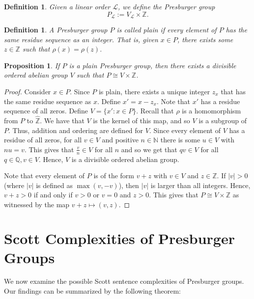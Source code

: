 \documentclass{amsart}%
\numberwithin{theorem}{section}
\newtheorem{definition}[theorem]{Definition}
\newtheorem{proposition}[theorem]{Proposition}
\newcommand{\Q}{\mathbb{Q}}
\newcommand{\Z}{\mathbb{Z}}
\newcommand{\N}{\mathbb{N}}
\newcommand{\0}{\emptyset}
\newcommand{\LL}{\mathcal{L}}
\begin{document}
\begin{definition}
\label{P_l def}
    Given a linear order $\LL$, we define the Presburger group $$P_\LL:=V_\LL\times \Z.$$ 
\end{definition}

\begin{definition}
A Presburger group $P$ is called plain if every element of $P$ has the same residue sequence as an integer. That is, given $x\in P$, there exists some $z\in \Z$ such that $\rho(x)=\rho(z)$. 
\end{definition}
\begin{proposition}
\label{plain}
If $P$ is a plain Presburger group, then there exists a divisible ordered abelian group $V$ such that $P\cong V \times \Z$. 
\end{proposition}

\begin{proof}
Consider $x\in P$. Since $P$ is plain, there exists a unique integer $z_x$ that has the same residue sequence as $x$. Define $x'=x-z_x$. Note that $x'$ has a residue sequence of all zeros. Define $V=\{x':x\in P\}$. Recall that $\rho$ is a homomorphism from $P$ to $\widehat{\Z}$. We have that $V$ is the kernel of this map, and so $V$ is a subgroup of $P$. Thus, addition and ordering are defined for $V$. Since every element of $V$ has a residue of all zeros, for all $v\in V$ and positive $n\in \N$ there is some $u\in V $ with $nu=v$. This gives that $\frac{v}{n}\in V$ for all $n$ and so we get that $qv\in V$ for all $q\in \Q, v\in V$. Hence, $V$ is a divisible ordered abelian group. 

Note that every element of $P$ is of the form $v+z$ with $v\in V$ and $z\in \Z$. If $|v|>0$ (where $|v|$ is defined as $\max(v,-v)$), then $|v|$ is larger than all integers. Hence, $v+z>0$ if and only if $v>0$ or $v=0$ and $z>0$. This gives that $P\cong V \times \Z$ as witnessed by the map $v+z \mapsto (v,z)$.  
\end{proof}


\section{Scott Complexities of Presburger Groups}\label{Scott Complexities Section}
    


We now examine the possible Scott sentence complexities of Presburger groups. Our findings can be summarized by the following theorem:
\end{document}
